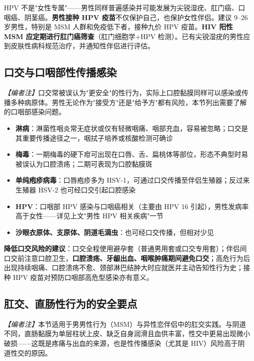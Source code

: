 \documentclass[12pt,a4paper,twoside]{ctexbook}
\begin{document}
\begin{tcolorbox}[colback=pink!5!white,colframe=red!50!black,title=贴心小叮咛]
HPV 不是"女性专属"——男性同样普遍感染并可能发展为尖锐湿疣、肛门癌、口咽癌、阴茎癌。\textbf{男性接种 HPV 疫苗}不仅保护自己，也保护女性伴侣。建议 9--26 岁男性，特别是 MSM 人群和免疫低下者，接种九价 HPV 疫苗。\textbf{HIV 阳性 MSM 应定期进行肛门癌筛查}（肛门细胞学+HPV 检测）。已有尖锐湿疣的男性应到皮肤性病科规范治疗，并通知性伴侣进行评估。
\end{tcolorbox}

\subsection{口交与口咽部性传播感染}

\noindent\textit{【编者注】}口交常被误认为"更安全"的性行为，实际上口腔黏膜同样可以感染或传播多种病原体。男性无论作为"接受方"还是"给予方"都有风险，本节列出需要了解的口咽部感染问题。

\begin{itemize}[leftmargin=2cm]
	\item \textbf{淋病}：淋菌性咽炎常无症状或仅有轻微咽痛、咽部充血，容易被忽略；口交是其重要传播途径之一，咽拭子培养或核酸检测可确诊
	\item \textbf{梅毒}：一期梅毒的硬下疳可出现在口唇、舌、扁桃体等部位，形态不典型时易被误认为口腔溃疡；二期可表现为口腔黏膜斑
	\item \textbf{单纯疱疹病毒}：口唇疱疹多为 HSV-1，可通过口交传播至伴侣生殖器；反过来生殖器 HSV-2 也可经口交引起口腔感染
	\item \textbf{HPV}：口咽部 HPV 感染与口咽癌相关（主要由 HPV 16 引起），男性发病率高于女性——详见上文"男性 HPV 相关疾病"一节
	\item \textbf{沙眼衣原体、支原体、阴道毛滴虫}：也可经口交传播，但相对少见
\end{itemize}

\textbf{降低口交风险的建议}：口交全程使用避孕套（普通男用套或口交专用套）；伴侣间口交前注意口腔卫生，\textbf{口腔溃疡、牙龈出血、咽喉肿痛期间避免口交}；高危行为后出现持续咽痛、口腔溃疡不愈、颈部淋巴结肿大时应就医并主动告知性行为史；接种 HPV 疫苗对预防口咽部高危型感染亦有意义。

\subsection{肛交、直肠性行为的安全要点}

\noindent\textit{【编者注】}本节适用于男男性行为（MSM）与异性恋伴侣中的肛交实践。与阴道不同，直肠黏膜为单层柱状上皮、缺乏自身润滑且血供丰富，性交中更易出现微小破损——这既是疼痛与出血的来源，也是性传播感染（尤其是 HIV）风险高于阴道性交的原因。
\end{document}
